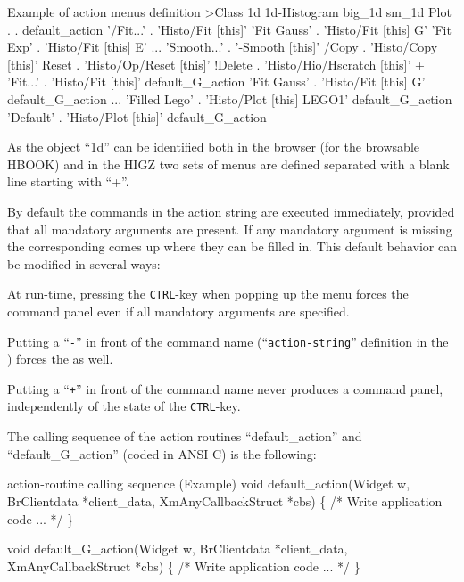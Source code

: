 \begin{XMPt} {Example of action menus definition}
>Class 1d 1d-Histogram big_1d sm_1d
 Plot                           .  . default_action%
'/Fit...'                       .  'Histo/Fit [this]'
'Fit Gauss'                     .  'Histo/Fit [this] G'
'Fit Exp'                       .  'Histo/Fit [this] E'
...
'Smooth...'                     .  '-Smooth [this]'
 /Copy                          .  'Histo/Copy [this]'
 Reset                          .  'Histo/Op/Reset [this]'
!Delete                         .  'Histo/Hio/Hscratch [this]'
+
'Fit...'                        .  'Histo/Fit [this]'        default_G_action%
'Fit Gauss'                     .  'Histo/Fit [this] G'      default_G_action%
...
'Filled Lego'                   .  'Histo/Plot [this] LEGO1' default_G_action%
'Default'                       .  'Histo/Plot [this]'       default_G_action%
\end{XMPt}
As the object ``1d'' can be identified both in the browser (for the browsable 
HBOOK) and in the HIGZ \GW{} two sets of menus are defined separated
with a blank line starting with ``+''. 

By default the commands in the action string are executed immediately,
provided that all mandatory arguments are present. If any mandatory 
argument is missing the corresponding \CAP{} comes up 
where they can be filled in. This default behavior can be modified in 
several ways:
\begin{UL}
\item
At run-time, pressing the {\tt CTRL}-key when popping up the menu forces the
command panel even if all mandatory arguments are specified.
\item
Putting a ``{\tt -}'' in front of the command name (``{\tt action-string}'' 
definition in the \CDF{}) forces the \CAP{} as well.
\item
Putting a ``{\tt +}'' in front of the command name never produces a
command panel, independently of the state of the {\tt CTRL}-key.
\end{UL}

The calling sequence of the action routines ``default\_action''
 and ``default\_G\_action'' (coded in ANSI C) is the following:

\begin{XMPt} {action-routine calling sequence (Example)}
void default_action(Widget w, BrClientdata *client_data,
                    XmAnyCallbackStruct *cbs)
\{
   /* Write application code ... */
\}

void default_G_action(Widget w, BrClientdata *client_data,
                      XmAnyCallbackStruct *cbs)
\{
   /* Write application code ... */
\}
\end{XMPt}

